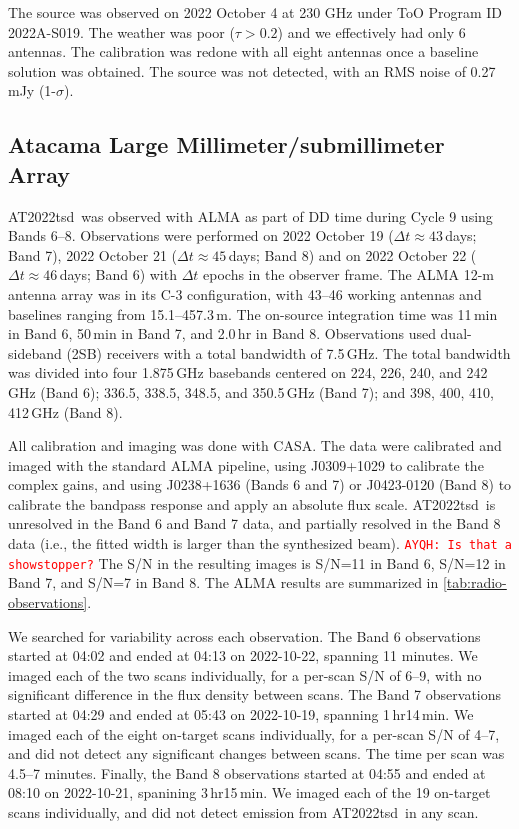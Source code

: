 \documentclass{nature_plusfigure}
\newcommand{\at}{AT2022tsd}
\newcommand{\ayqh}[1]{{\textcolor{red}{\texttt{AYQH: #1}}}}
\begin{document}
\begin{methods}
The source was observed on 2022 October 4 at 230 GHz under ToO Program ID 2022A-S019.
The weather was poor ($\tau > 0.2$) and we effectively had only 6 antennas. The calibration was redone with all eight antennas once a baseline solution was obtained. The source was not detected, with an RMS noise of 0.27\,mJy (1-$\sigma$).

\subsection{Atacama Large Millimeter/submillimeter Array}
\label{sec:ALMA}

\at\ was observed with ALMA as part of DD time during Cycle 9 using Bands 6--8. Observations were performed on 2022 October 19 ($\Delta t \approx 43$\,days; Band 7), 2022 October 21 ($\Delta t \approx 45$\,days; Band 8) and on 2022 October 22 ($\Delta t \approx 46$\,days; Band 6) with $\Delta t$ epochs in the observer frame. The ALMA 12-m antenna array was in its C-3 configuration, with
43--46 working antennas and baselines ranging from 15.1--457.3\,m. The on-source integration time was
11\,min in Band 6, 50\,min in Band 7, and 2.0\,hr in Band 8.
Observations used dual-sideband (2SB) receivers with a total bandwidth of 7.5\,GHz. The total bandwidth was divided into four 1.875\,GHz basebands centered on 224, 226, 240, and 242\,GHz (Band 6);
336.5, 338.5, 348.5, and 350.5\,GHz (Band 7);
and 398, 400, 410, 412\,GHz (Band 8).


All calibration and imaging was done with CASA.
The data were calibrated and imaged
with the standard ALMA pipeline, using J0309+1029 to calibrate the complex gains, and using J0238+1636 (Bands 6 and 7) or J0423-0120 (Band 8) to calibrate the bandpass response and apply an absolute flux scale.
\at\ is unresolved in the Band 6 and Band 7 data, and partially resolved in the Band 8 data (i.e., the fitted width is larger than the synthesized beam). \ayqh{Is that a showstopper?}
The S/N in the resulting images is S/N=11 in Band 6, S/N=12 in Band 7, and S/N=7 in Band 8.
The ALMA results are summarized in \ref{tab:radio-observations}.

We searched for variability across each observation. The Band 6 observations started at 04:02 and ended at 04:13 on 2022-10-22, spanning 11 minutes. We imaged each of the two scans individually, for a per-scan S/N of 6--9, with no significant difference in the flux density between scans.
The Band 7 observations started at 04:29 and ended at 05:43 on 2022-10-19, spanning 1\,hr14\,min.
We imaged each of the eight on-target scans individually, for a per-scan S/N of 4--7, and did not detect any significant changes between scans. The time per scan was 4.5--7 minutes.
Finally, the Band 8 observations started at 04:55 and ended at 08:10 on 2022-10-21, spanining 3\,hr15\,min. We imaged each of the 19 on-target scans individually, and did not detect emission from \at\ in any scan.


\end{methods}
\end{document}
